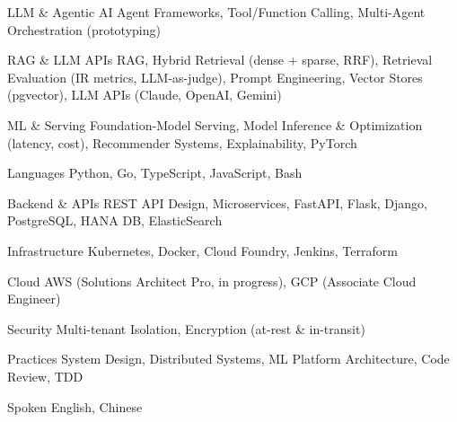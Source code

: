 

\begin{cvskills}

  \cvskill
    {LLM \& Agentic AI} %
    {Agent Frameworks, Tool/Function Calling, Multi-Agent Orchestration (prototyping)} %

  \cvskill
    {RAG \& LLM APIs} %
    {RAG, Hybrid Retrieval (dense + sparse, RRF), Retrieval Evaluation (IR metrics, LLM-as-judge), Prompt Engineering, Vector Stores (pgvector), LLM APIs (Claude, OpenAI, Gemini)} %

  \cvskill
    {ML \& Serving} %
    {Foundation-Model Serving, Model Inference \& Optimization (latency, cost), Recommender Systems, Explainability, PyTorch} %

  \cvskill
    {Languages} %
    {Python, Go, TypeScript, JavaScript, Bash} %

  \cvskill
    {Backend \& APIs} %
    {REST API Design, Microservices, FastAPI, Flask, Django, PostgreSQL, HANA DB, ElasticSearch} %

  \cvskill
    {Infrastructure} %
    {Kubernetes, Docker, Cloud Foundry, Jenkins, Terraform} %

  \cvskill
    {Cloud} %
    {AWS (Solutions Architect Pro, in progress), GCP (Associate Cloud Engineer)} %

  \cvskill
    {Security} %
    {Multi-tenant Isolation, Encryption (at-rest \& in-transit)} %

  \cvskill
    {Practices} %
    {System Design, Distributed Systems, ML Platform Architecture, Code Review, TDD} %

  \cvskill
    {Spoken} %
    {English, Chinese} %


\end{cvskills}
